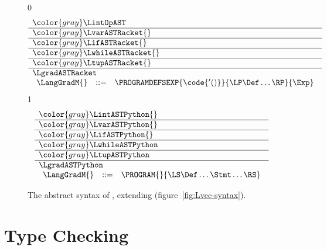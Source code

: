 \documentclass[7x10]{TimesAPriori_MIT}%
\newcommand{\gray}[1]{{\color{gray} #1}}
\def\racketEd{0}
\def\pythonEd{1}
\def\edition{1}
\newcommand{\pythonColor}[0]{}
\numberwithin{theorem}{chapter}
\numberwithin{definition}{chapter}
\numberwithin{equation}{chapter}
\begin{document}
\begin{figure}[tbp]
\centering
\begin{tcolorbox}[colback=white]
    \small
{\if\edition\racketEd
\[
\begin{array}{l}
  \gray{\LintOpAST} \\ \hline
  \gray{\LvarASTRacket{}} \\ \hline
  \gray{\LifASTRacket{}} \\ \hline
  \gray{\LwhileASTRacket{}} \\ \hline
  \gray{\LtupASTRacket{}} \\ \hline
  \LgradASTRacket \\
\begin{array}{lcl}
  \LangGradM{} &::=& \PROGRAMDEFSEXP{\code{'()}}{\LP\Def\ldots\RP}{\Exp}
\end{array}
\end{array}
\]
\fi}
{\if\edition\pythonEd\pythonColor
\[
\begin{array}{l}
  \gray{\LintASTPython{}} \\ \hline
  \gray{\LvarASTPython{}} \\ \hline
  \gray{\LifASTPython{}} \\ \hline
  \gray{\LwhileASTPython} \\ \hline
  \gray{\LtupASTPython} \\   \hline
  \LgradASTPython \\
  \begin{array}{lcl}
    \LangGradM{} &::=& \PROGRAM{}{\LS \Def \ldots \Stmt \ldots \RS}
  \end{array}
\end{array}
\]
\fi}
\end{tcolorbox}

\caption{The abstract syntax of \LangGrad{}, extending \LangVec{} (figure~\ref{fig:Lvec-syntax}).}
\label{fig:Lgrad-syntax}
\end{figure}




\section{Type Checking \LangGrad{}}
\label{sec:gradual-type-check}
\end{document}
